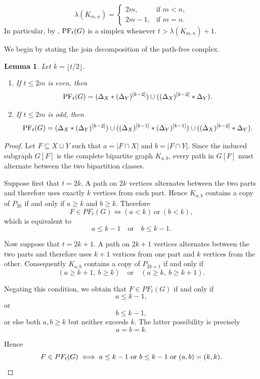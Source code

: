 \documentclass[12pt,reqno]{amsart}
\newtheorem{lemma}[lemma]{Lemma}
\theoremstyle{definition}
\newcommand{\PF}{{\rm PF}}
\begin{document}
\begin{equation}\label{max-path-length in CBG}
\lambda(K_{m,n})=
\begin{cases}
2m, & \text{if } m<n,\\[2pt]
2m-1, & \text{if } m=n.
\end{cases}
\end{equation}
In particular, by , $\PF_t(G)$ is a simplex whenever $t>\lambda(K_{m,n})+1$.



We begin by stating the join decomposition of the path-free complex. 


\begin{lemma}\label{lem: structure of the complex CBG1}
Let $k=\lfloor t/2\rfloor$.
\begin{enumerate}
    \item If $t\le 2m$ is even, then
    \[
    \PF_t(G)
    =
    (\Delta_X * (\Delta_{Y})^{[k-2]})
    \cup
    ((\Delta_X)^{[k-2]} * \Delta_Y).
    \]
    \item If $t\le 2m$ is odd, then
    \[
    \PF_t(G)
    =
    (\Delta_X * (\Delta_{Y})^{[k-2]})
    \cup
    ((\Delta_{X})^{[k-1]} * (\Delta_{Y})^{[k-1]})
    \cup
    ((\Delta_{X})^{[k-2]} * \Delta_Y).
    \]
\end{enumerate}
\end{lemma}



\begin{proof}
Let $F\subseteq X\sqcup Y$ such that $a=|F\cap X|$ and $b=|F\cap Y|$.
Since the induced subgraph $G[F]$ is the complete bipartite graph $K_{a,b}$, every path in $G[F]$
must alternate between the two bipartition classes.

Suppose first that $t=2k$.
A path on $2k$ vertices alternates between the two parts and therefore uses
exactly $k$ vertices from each part.
Hence $K_{a,b}$ contains a copy of $P_{2k}$ if and only if
$a\ge k$ and $b\ge k$.
Therefore
\[
F\in PF_t(G)
\iff
(a<k)\ \text{or}\ (b<k),
\]
which is equivalent to
\[
a\le k-1 \quad\text{or}\quad b\le k-1.
\]

Now suppose that $t=2k+1$.
A path on $2k+1$ vertices alternates between the two parts and therefore uses
$k+1$ vertices from one part and $k$ vertices from the other.
Consequently $K_{a,b}$ contains a copy of $P_{2k+1}$ if and only if
\[
(a\ge k+1,\ b\ge k)
\quad\text{or}\quad
(a\ge k,\ b\ge k+1).
\]

Negating this condition, we obtain that $F\in PF_t(G)$ if and only if
\[
a\le k-1,
\]
or
\[
b\le k-1,
\]
or else both $a,b\ge k$ but neither exceeds $k$.
The latter possibility is precisely
\[
a=b=k.
\]

Hence
\[
F\in PF_t(G)
\iff
a\le k-1
\ \text{or}\
b\le k-1
\ \text{or}\
(a,b)=(k,k).
\qedhere \]
\end{proof}
\end{document}
